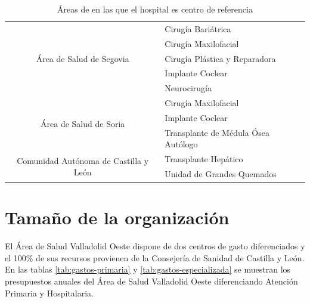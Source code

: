 \begin{table}
\begin{tabular}{cl}
        \midrule
        \multirow{5}{*}{Área de Salud de   Segovia}              & Cirugía Bariátrica                   \\
                                                                 & Cirugía Maxilofacial                 \\
                                                                 & Cirugía Plástica y Reparadora        \\
                                                                 & Implante Coclear                     \\
                                                                 & Neurocirugía                         \\
        \midrule
        \multirow{3}{*}{Área de Salud de   Soria}                & Cirugía Maxilofacial                 \\
                                                                 & Implante Coclear                     \\
                                                                 & Transplante de Médula Ósea Autólogo  \\
        \midrule
        \multirow{2}{*}{Comunidad Autónoma   de Castilla y León} & Transplante Hepático                 \\
                                                                 & Unidad de Grandes Quemados           \\
        \bottomrule
    \end{tabular}
    \caption{Áreas de en las que el hospital es centro de referencia}
\end{table}

\section{Tamaño de la organización}

El Área de Salud Valladolid Oeste dispone de dos centros de gasto diferenciados y el 100\% de sus recursos provienen de la Consejería de Sanidad de Castilla y León. En las tablas \ref{tab:gastos-primaria} y \ref{tab:gastos-especializada} se muestran los presupuestos anuales del Área de Salud Valladolid Oeste diferenciando Atención Primaria y Hospitalaria.

